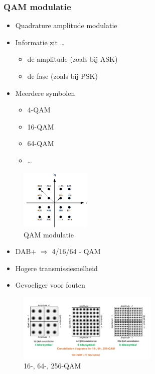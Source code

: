 \documentclass{article}
\begin{document}
\subsubsection{QAM modulatie}
\begin{itemize}
    \item Quadrature amplitude modulatie
    \item Informatie zit \dots
    \begin{itemize}
        \item de amplitude (zoals bij ASK)
        \item de fase (zoals bij PSK)
    \end{itemize}
    \item Meerdere symbolen
    \begin{itemize}
        \item 4-QAM
        \item 16-QAM
        \item 64-QAM
        \item \dots
    \end{itemize}
\end{itemize}

\begin{figure}[H]
    \centering
    \includegraphics[width=0.3\textwidth]{Screenshot_20200315_160021.png}
    \caption{QAM modulatie}
\end{figure}


\begin{itemize}
    \item DAB+ $\Rightarrow$ 4/16/64 - QAM
    \item Hogere transmissiesnelheid
    \item Gevoeliger voor fouten
\end{itemize}

\begin{figure}[H]
    \centering
    \includegraphics[width=0.6\textwidth]{Screenshot_20200302_123030.png}
    \caption{16-, 64-, 256-QAM}
\end{figure}
\end{document}
